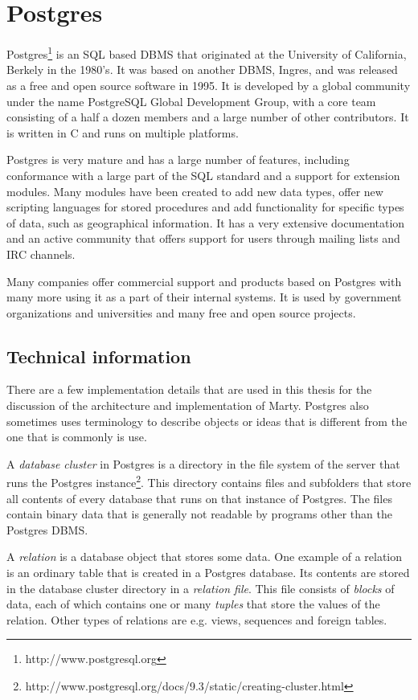 \section{Postgres}
Postgres\footnote{http://www.postgresql.org} is an SQL based DBMS that originated at the University of California, Berkely in the 1980's.
It was based on another DBMS, Ingres, and was released as a free and open source software in 1995.
It is developed by a global community under the name PostgreSQL Global Development Group, with a core team consisting of a half a dozen members and a large number of other contributors.
It is written in C and runs on multiple platforms.

Postgres is very mature and has a large number of features, including conformance with a large part of the SQL standard and a support for extension modules.
Many modules have been created to add new data types, offer new scripting languages for stored procedures and add functionality for specific types of data, such as geographical information.
It has a very extensive documentation and an active community that offers support for users through mailing lists and IRC channels.

Many companies offer commercial support and products based on Postgres with many more using it as a part of their internal systems.
It is used by government organizations and universities and many free and open source projects.

\subsection{Technical information}
There are a few implementation details that are used in this thesis for the discussion of the architecture and implementation of Marty.
Postgres also sometimes uses terminology to describe objects or ideas that is different from the one that is commonly is use.

A \textit{database cluster} in Postgres is a directory in the file system of the server that runs the Postgres instance\footnote{http://www.postgresql.org/docs/9.3/static/creating-cluster.html}.
This directory contains files and subfolders that store all contents of every database that runs on that instance of Postgres.
The files contain binary data that is generally not readable by programs other than the Postgres DBMS.

A \textit{relation} is a database object that stores some data.
One example of a relation is an ordinary table that is created in a Postgres database.
Its contents are stored in the database cluster directory in a \textit{relation file}.
This file consists of \textit{blocks} of data, each of which contains one or many \textit{tuples} that store the values of the relation.
Other types of relations are e.g. views, sequences and foreign tables.

